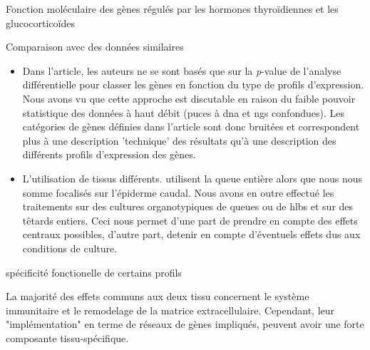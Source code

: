 \documentclass[../main.tex]{subfiles}
\begin{document}
\begin{chapter}{Fonction moléculaire des gènes régulés par les hormones thyroïdiennes et les glucocorticoïdes}
\begin{section}{Comparaison avec des données similaires}
\begin{itemize}
\item Dans l'article, les auteurs ne se sont basés que sur la \textit{p}-value de l'analyse différentielle pour classer les gènes en fonction du type de profils d'expression.
Nous avons vu que cette approche est discutable en raison du faible pouvoir statistique des données à haut débit (puces à \gls{dna} et \gls{ngs} confondues).
Les catégories de gènes définies dans l'article sont donc bruitées et correspondent plus à une description 'technique' des résultats qu'à une description des différents profils d'expression des gènes.
\item L'utilisation de tissus différents.
\citep{Kulkarni2011} utilisent la queue entière alors que nous nous somme focalisés sur l'épiderme caudal.
Nous avons en outre effectué les traitements sur des cultures organotypiques de queues ou de \glspl{hlb} et sur des têtards entiers.
Ceci nous permet d'une part de prendre en compte des effets centraux possibles, d'autre part, detenir en compte d'éventuels effets dus aux conditions de culture.
\end{itemize}

\end{section}


\begin{section}{spécificité fonctionelle de certains profils}

La majorité des effets communs aux deux tissu concernent le système immunitaire et le remodelage de la matrice extracellulaire.
Cependant, leur "implémentation" en terme de réseaux de gènes impliqués, peuvent avoir une forte composante tissu-spécifique.


\end{section}
\end{chapter}
\end{document}
